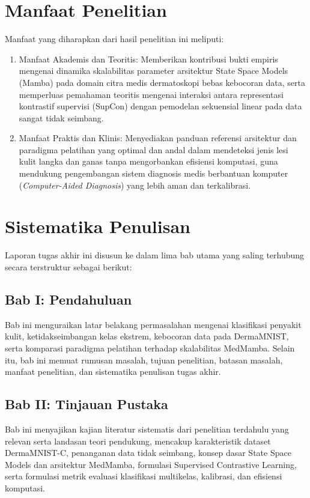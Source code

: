 \section{Manfaat Penelitian} \label{I.Manfaat}
Manfaat yang diharapkan dari hasil penelitian ini meliputi: \par

\begin{enumerate}[noitemsep]
    \item Manfaat Akademis dan Teoritis: Memberikan kontribusi bukti empiris mengenai dinamika skalabilitas parameter arsitektur State Space Models (Mamba) pada domain citra medis dermatoskopi bebas kebocoran data, serta memperluas pemahaman teoritis mengenai interaksi antara representasi kontrastif supervisi (SupCon) dengan pemodelan sekuensial linear pada data sangat tidak seimbang.
    \item Manfaat Praktis dan Klinis: Menyediakan panduan referensi arsitektur dan paradigma pelatihan yang optimal dan andal dalam mendeteksi jenis lesi kulit langka dan ganas tanpa mengorbankan efisiensi komputasi, guna mendukung pengembangan sistem diagnosis medis berbantuan komputer (\textit{Computer-Aided Diagnosis}) yang lebih aman dan terkalibrasi.
\end{enumerate}

\section{Sistematika Penulisan} \label{I.Sistematika}
Laporan tugas akhir ini disusun ke dalam lima bab utama yang saling terhubung secara terstruktur sebagai berikut: \par

\subsection*{Bab I: Pendahuluan}
Bab ini menguraikan latar belakang permasalahan mengenai klasifikasi penyakit kulit, ketidakseimbangan kelas ekstrem, kebocoran data pada DermaMNIST, serta komparasi paradigma pelatihan terhadap skalabilitas MedMamba. Selain itu, bab ini memuat rumusan masalah, tujuan penelitian, batasan masalah, manfaat penelitian, dan sistematika penulisan tugas akhir. \par

\subsection*{Bab II: Tinjauan Pustaka}
Bab ini menyajikan kajian literatur sistematis dari penelitian terdahulu yang relevan serta landasan teori pendukung, mencakup karakteristik dataset DermaMNIST-C, penanganan data tidak seimbang, konsep dasar State Space Models dan arsitektur MedMamba, formulasi Supervised Contrastive Learning, serta formulasi metrik evaluasi klasifikasi multikelas, kalibrasi, dan efisiensi komputasi. \par

